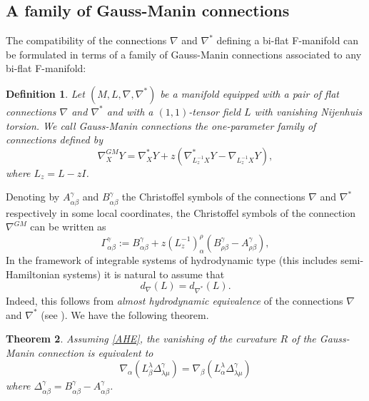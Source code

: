 \documentclass[11pt,a4paper]{amsart}
\numberwithin{equation}{section}
\newtheorem{theorem}{Theorem}[section]
\newtheorem{definition}[theorem]{Definition}
\newcommand{\qa}{\alpha}
\newcommand{\qb}{\beta}
\newcommand{\qg}{\gamma}
\newcommand{\ql}{\lambda}
\numberwithin{equation}{section}
\begin{document}
\subsection{A family of Gauss-Manin connections}
 The compatibility of the connections $\nabla$ and $\nabla^*$ defining a bi-flat F-manifold can be formulated in terms of a family of Gauss-Manin connections associated to any bi-flat F-manifold: 
\begin{definition}
Let $(M,L,\nabla,\nabla^*)$ be a manifold equipped with a pair of flat connections
 $\nabla$ and $\nabla^*$ and with a $(1,1)$-tensor field $L$ with vanishing Nijenhuis torsion.  We call Gauss-Manin connections the one-parameter family of connections defined by
\begin{equation}\label{GMnoindex}
\nabla^{GM}_XY=\nabla^*_XY+z(\nabla^*_{L_{z}^{-1}X}Y-\nabla_{L_{z}^{-1}X}Y),
\end{equation}
where $L_z=L-z I$. 
\end{definition}
Denoting by $A^{\qg}_{\qa\qb}$ and $B^{\qg}_{\qa\qb}$ the Christoffel symbols of the connections $\nabla$ and $\nabla^*$ respectively in some local coordinates, the Christoffel symbols of the connection $\nabla^{GM}$ can be written as
\begin{equation}\label{GM}
\Gamma^{\qg}_{\qa\qb}:=B^{\qg}_{\qa\qb}+z\left(L_{z}^{-1}\right)^\rho_\qa\left(B^\qg_{\rho\qb}-A^\qg_{\rho\qb}\right),
\end{equation}
In the framework of integrable systems of hydrodynamic type (this includes semi-Hamiltonian systems) it is natural to assume that
\begin{equation}\label{AHE}
d_{\nabla}(L)=d_{\nabla^*}(L).
\end{equation} 
Indeed, this follows from \emph{almost hydrodynamic equivalence} of the connections
 $\nabla$ and $\nabla^*$ (see \cite{ALimrn}). We have the following theorem.
\begin{theorem}
  \label{BZ}
 Assuming \eqref{AHE}, the vanishing of the curvature $R$ of the Gauss-Manin connection is equivalent to 
\begin{equation}\label{flatnessGM}
\nabla_\qa\left(L^\ql_\qb\Delta^\qg_{\ql\mu}\right)=\nabla_\qb\left(L^\ql_\qa\Delta^\qg_{\ql\mu}\right)
\end{equation}
where $\Delta^\qg_{\qa\qb}=B^\qg_{\qa\qb}-A^\qg_{\qa\qb}$.
\end{theorem}
\end{document}
